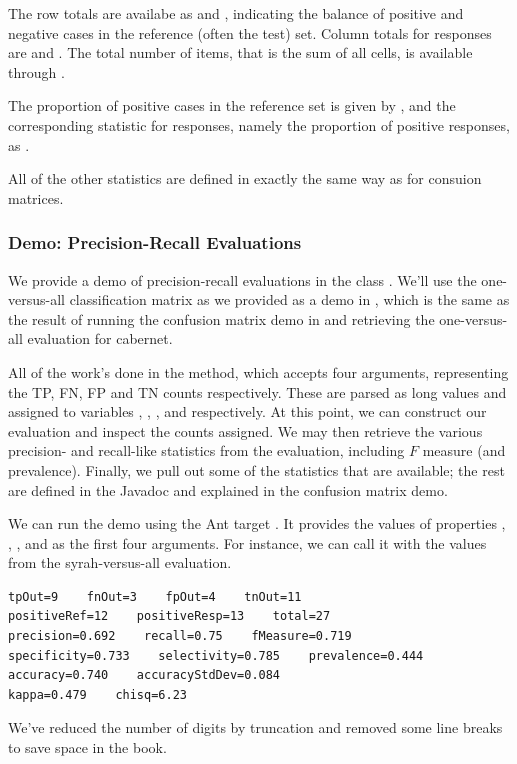 The row totals are availabe as  and
, indicating the balance of positive and
negative cases in the reference (often the test) set.  Column totals
for responses are  and
.  The total number of items, that is the
sum of all cells, is available through .

The proportion of positive cases in the reference set is given by
, and the corresponding statistic for
responses, namely the proportion of positive responses, as
.  

All of the other statistics are defined in exactly the same way as for
consuion matrices.

\subsubsection{Demo: Precision-Recall Evaluations}

We provide a demo of precision-recall evaluations in the class
.  We'll use the one-versus-all
classification matrix as we provided as a demo in
, which is the same as the result of
running the confusion matrix demo in
 and retrieving the
one-versus-all evaluation for cabernet.

All of the work's done in the  method, which accepts four
arguments, representing the TP, FN, FP and TN counts respectively.
These are parsed as long values and assigned to variables ,
, , and  respectively.  At this point,
we can construct our evaluation and inspect the counts assigned.
%
%
We may then retrieve the various precision- and recall-like statistics
from the evaluation, including $F$ measure (and prevalence).
%
%
Finally, we pull out some of the statistics that are available; the
rest are defined in the Javadoc and explained in the confusion matrix
demo.
%

We can run the demo using the Ant target .  It
provides the values of properties , , , and
 as the first four arguments.  For instance, we can call it
with the values from the syrah-versus-all evaluation.
%
\begin{verbatim}
tpOut=9    fnOut=3    fpOut=4    tnOut=11
positiveRef=12    positiveResp=13    total=27
precision=0.692    recall=0.75    fMeasure=0.719
specificity=0.733    selectivity=0.785    prevalence=0.444
accuracy=0.740    accuracyStdDev=0.084
kappa=0.479    chisq=6.23
\end{verbatim}
%
We've reduced the number of digits by truncation and removed some
line breaks to save space in the book.


